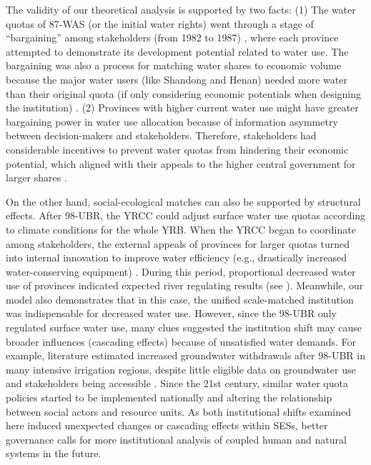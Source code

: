 The validity of our theoretical analysis is supported by two facts:
(1) The water quotas of 87-WAS (or the initial water rights) went through a stage of ``bargaining'' among stakeholders (from 1982 to 1987) \cite{wang2019a, wang2019d}, where each province attempted to demonstrate its development potential related to water use.
The bargaining was also a process for matching water shares to economic volume because the major water users (like Shandong and Henan) needed more water than their original quota (if only considering economic potentials when designing the institution) \cite{zuo2020}.
(2) Provinces with higher current water use might have greater bargaining power in water use allocation because of information asymmetry between decision-makers and stakeholders.
Therefore, stakeholders had considerable incentives to prevent water quotas from hindering their economic potential, which aligned with their appeals to the higher central government for larger shares \cite{wang2019a, wang2019d}.

\label{discussion-3}
On the other hand, social-ecological matches can also be supported by structural effects.
After 98-UBR, the YRCC could adjust surface water use quotas according to climate conditions for the whole YRB.
When the YRCC began to coordinate among stakeholders, the external appeals of provinces for larger quotas turned into internal innovation to improve water efficiency (e.g., drastically increased water-conserving equipment)
\cite{krieger1955, ostrom1990}.
During this period, proportional decreased water use of provinces indicated expected river regulating results (see ).
Meanwhile, our model also demonstrates that in this case, the unified scale-matched institution was indispensable for decreased water use.
However, since the 98-UBR only regulated surface water use, many clues suggested the institution shift may cause broader influences (cascading effects) because of unsatisfied water demands.
For example, literature estimated increased groundwater withdrawals after 98-UBR in many intensive irrigation regions, despite little eligible data on groundwater use and stakeholders being accessible \cite{sun2022b}.
Since the 21st century, similar water quota policies started to be implemented nationally and altering the relationship between social actors and resource units.
As both institutional shifts examined here induced unexpected changes or cascading effects within SESs, better governance calls for more institutional analysis of coupled human and natural systems in the future.

